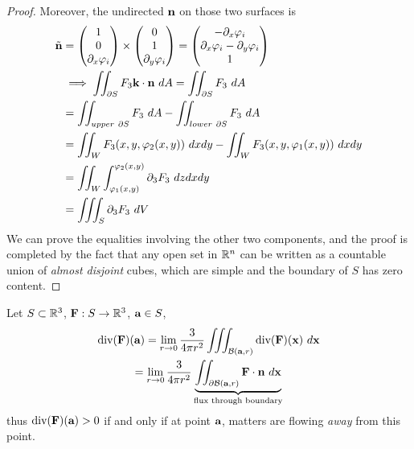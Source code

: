 \documentclass[11pt]{article}
\begin{document}
\begin{theorem}
\begin{proof}[Proof]
				 Moreover, the undirected $\textbf{n}$ on those two surfaces is
				 \begin{align}
				 	\tilde{\textbf{n}} &= \begin{pmatrix} 1 \\ 0 \\ \partial_x \varphi_i \end{pmatrix} \times \begin{pmatrix} 0 \\ 1 \\ \partial_y \varphi_i \end{pmatrix} = \begin{pmatrix} - \partial_x \varphi_i \\ \partial_x \varphi_i - \partial_y \varphi_i \\ 1 \end{pmatrix} \\
				 	&\implies \iint_{\partial S} F_3 \textbf{k} \cdot \textbf{n}\ dA = \iint_{\partial S} F_3\ dA \\
				 	&= \iint_{upper\ \partial S} F_3\ dA - \iint_{lower\ \partial S} F_3\ dA \\
				 	&= \iint_{W} F_3 (x, y, \varphi_2(x, y))\ dx dy -  \iint_{W} F_3 (x, y, \varphi_1(x, y))\ dx dy \\
				 	&= \iint_W \int_{\varphi_1(x, y)}^{\varphi_2(x, y)} \partial_3 F_3\ dz dx dy \\
				 	&= \iiint_S \partial_3 F_3 \ dV
				 \end{align}
				 We can prove the equalities involving the other two components, and the proof is completed by the fact that any open set in $\mathbb{R}^n$ can be written as a countable union of \emph{almost disjoint} cubes, which are simple and the boundary of $S$ has zero content.
				\end{proof}
			\end{theorem}
			
			\begin{proposition}
				Let $S \subset \mathbb{R}^3$, $\textbf{F}: S \to \mathbb{R}^3$, $\textbf{a} \in S$, 
				\begin{gather}
					\dive(\ve{F})(\ve{a}) = \lim_{r \to 0} \frac{3}{4 \pi r^2} \iiint_{\mc{B}(\ve{a}, r)} \dive(\ve{F})(\ve{x})\ d\ve{x} \\
					= \lim_{r \to 0} \frac{3}{4 \pi r^2} \underbrace{\iint_{\partial \mc{B}(\ve{a}, r)} \ve{F} \cdot \ve{n}\ d\ve{x}}_{\tx{flux through boundary}}
				\end{gather}
				thus $\text{div}(\textbf{F})(\textbf{a}) > 0$ if and only if at point $\textbf{a}$, matters are flowing \emph{away} from this point.
			\end{proposition}
			
\end{document}
